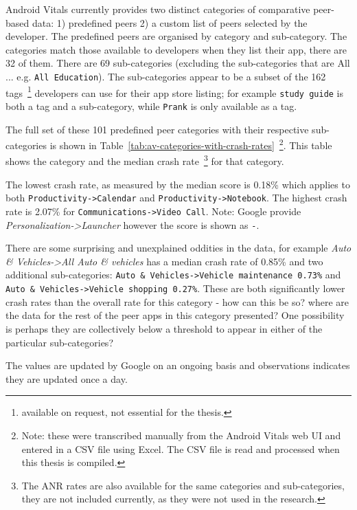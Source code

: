Android Vitals currently provides two distinct categories of comparative peer-based data: 1) predefined peers 2) a custom list of peers selected by the developer. The predefined peers are organised by category and sub-category. The categories match those available to developers when they list their app, there are 32 of them. There are 69 sub-categories (excluding the sub-categories that are All ... e.g. \texttt{All Education}). The sub-categories appear to be a subset of the 162 tags~\footnote{available on request, not essential for the thesis.} developers can use for their app store listing; for example \texttt{study guide} is both a tag and a sub-category, while \texttt{Prank} is only available as a tag. 

The full set of these 101 predefined peer categories with their respective sub-categories is shown in Table~\ref{tab:av-categories-with-crash-rates}~\footnote{Note: these were transcribed manually from the Android Vitals web UI and entered in a CSV file using Excel. The CSV file is read and processed when this thesis is compiled.}. This table shows the category and the median crash rate~\footnote{The ANR rates are also available for the same categories and sub-categories, they are not included currently, as they were not used in the research.} for that category.

The lowest crash rate, as measured by the median score is 0.18\% which applies to both \texttt{Productivity->Calendar} and \texttt{Productivity->Notebook}. The highest crash rate is 2.07\% for \texttt{Communications->Video Call}. Note: Google provide \textit{Personalization->Launcher} however the score is shown as \texttt{-}. %
 

There are some surprising and unexplained oddities in the data, for example \textit{Auto \& Vehicles->All Auto \& vehicles} has a median crash rate of 0.85\% and two additional sub-categories: \texttt{Auto \& Vehicles->Vehicle maintenance 0.73\%} and \texttt{Auto \& Vehicles->Vehicle shopping 0.27\%}. These are both significantly lower crash rates than the overall rate for this category - how can this be so? where are the data for the rest of the peer apps in this category presented? One possibility is perhaps they are collectively below a threshold to appear in either of the particular sub-categories?

The values are updated by Google on an ongoing basis and observations indicates they are updated once a day.

